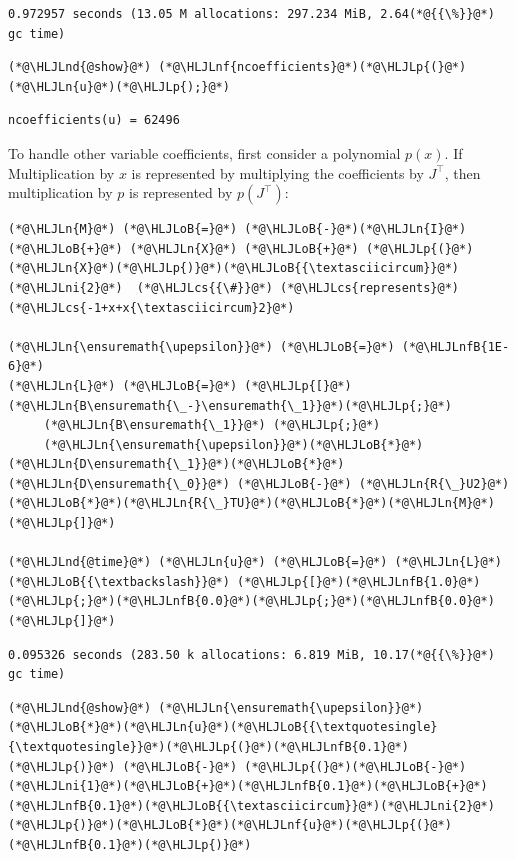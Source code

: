 \documentclass[12pt,a4paper]{article}
\newcommand{\HLJLn}[1]{#1}
\newcommand{\HLJLnd}[1]{\textcolor[RGB]{214,102,97}{#1}}
\newcommand{\HLJLnf}[1]{\textcolor[RGB]{66,102,213}{#1}}
\newcommand{\HLJLnfB}[1]{\textcolor[RGB]{59,151,46}{#1}}
\newcommand{\HLJLni}[1]{\textcolor[RGB]{59,151,46}{#1}}
\newcommand{\HLJLoB}[1]{\textcolor[RGB]{102,102,102}{\textbf{#1}}}
\newcommand{\HLJLp}[1]{#1}
\newcommand{\HLJLcs}[1]{\textcolor[RGB]{153,153,119}{\textit{#1}}}
\def\upepsilon{\varepsilon}
\begin{document}
\begin{lstlisting}
0.972957 seconds (13.05 M allocations: 297.234 MiB, 2.64(*@{{\%}}@*) gc time)
\end{lstlisting}


\begin{lstlisting}
(*@\HLJLnd{@show}@*) (*@\HLJLnf{ncoefficients}@*)(*@\HLJLp{(}@*)(*@\HLJLn{u}@*)(*@\HLJLp{);}@*)
\end{lstlisting}

\begin{lstlisting}
ncoefficients(u) = 62496
\end{lstlisting}


To handle other variable coefficients, first consider a polynomial $p(x)$. If Multiplication by $x$ is represented by multiplying the coefficients by $J^\top$, then multiplication by $p$ is represented by $p(J^\top)$:


\begin{lstlisting}
(*@\HLJLn{M}@*) (*@\HLJLoB{=}@*) (*@\HLJLoB{-}@*)(*@\HLJLn{I}@*) (*@\HLJLoB{+}@*) (*@\HLJLn{X}@*) (*@\HLJLoB{+}@*) (*@\HLJLp{(}@*)(*@\HLJLn{X}@*)(*@\HLJLp{)}@*)(*@\HLJLoB{{\textasciicircum}}@*)(*@\HLJLni{2}@*)  (*@\HLJLcs{{\#}}@*) (*@\HLJLcs{represents}@*) (*@\HLJLcs{-1+x+x{\textasciicircum}2}@*)

(*@\HLJLn{\ensuremath{\upepsilon}}@*) (*@\HLJLoB{=}@*) (*@\HLJLnfB{1E-6}@*)
(*@\HLJLn{L}@*) (*@\HLJLoB{=}@*) (*@\HLJLp{[}@*)(*@\HLJLn{B\ensuremath{\_-}\ensuremath{\_1}}@*)(*@\HLJLp{;}@*) 
     (*@\HLJLn{B\ensuremath{\_1}}@*) (*@\HLJLp{;}@*) 
     (*@\HLJLn{\ensuremath{\upepsilon}}@*)(*@\HLJLoB{*}@*)(*@\HLJLn{D\ensuremath{\_1}}@*)(*@\HLJLoB{*}@*)(*@\HLJLn{D\ensuremath{\_0}}@*) (*@\HLJLoB{-}@*) (*@\HLJLn{R{\_}U2}@*)(*@\HLJLoB{*}@*)(*@\HLJLn{R{\_}TU}@*)(*@\HLJLoB{*}@*)(*@\HLJLn{M}@*)(*@\HLJLp{]}@*)

(*@\HLJLnd{@time}@*) (*@\HLJLn{u}@*) (*@\HLJLoB{=}@*) (*@\HLJLn{L}@*) (*@\HLJLoB{{\textbackslash}}@*) (*@\HLJLp{[}@*)(*@\HLJLnfB{1.0}@*)(*@\HLJLp{;}@*)(*@\HLJLnfB{0.0}@*)(*@\HLJLp{;}@*)(*@\HLJLnfB{0.0}@*)(*@\HLJLp{]}@*)
\end{lstlisting}

\begin{lstlisting}
0.095326 seconds (283.50 k allocations: 6.819 MiB, 10.17(*@{{\%}}@*) gc time)
\end{lstlisting}


\begin{lstlisting}
(*@\HLJLnd{@show}@*) (*@\HLJLn{\ensuremath{\upepsilon}}@*)(*@\HLJLoB{*}@*)(*@\HLJLn{u}@*)(*@\HLJLoB{{\textquotesingle}{\textquotesingle}}@*)(*@\HLJLp{(}@*)(*@\HLJLnfB{0.1}@*)(*@\HLJLp{)}@*) (*@\HLJLoB{-}@*) (*@\HLJLp{(}@*)(*@\HLJLoB{-}@*)(*@\HLJLni{1}@*)(*@\HLJLoB{+}@*)(*@\HLJLnfB{0.1}@*)(*@\HLJLoB{+}@*)(*@\HLJLnfB{0.1}@*)(*@\HLJLoB{{\textasciicircum}}@*)(*@\HLJLni{2}@*)(*@\HLJLp{)}@*)(*@\HLJLoB{*}@*)(*@\HLJLnf{u}@*)(*@\HLJLp{(}@*)(*@\HLJLnfB{0.1}@*)(*@\HLJLp{)}@*)
\end{lstlisting}
\end{document}
